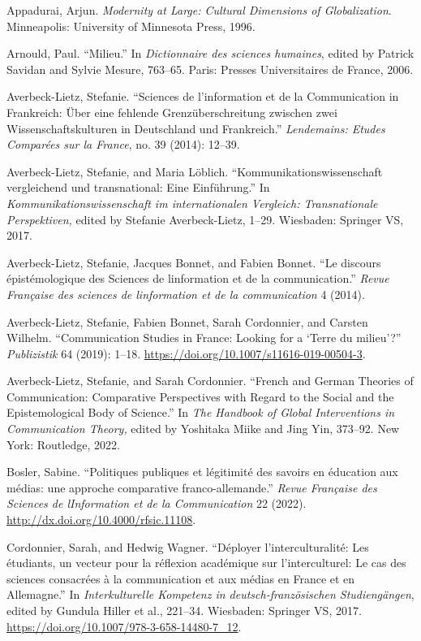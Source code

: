 \documentclass{tufte-handout}
\begin{document}
\begin{hangparas}{.25in}{1} 

\enlargethispage{\baselineskip}

Appadurai, Arjun. \emph{Modernity at Large: Cultural Dimensions of
Globalization}. Minneapolis: University of Minnesota Press, 1996.

Arnould, Paul. ``Milieu.'' In \emph{Dictionnaire des sciences humaines},
edited by Patrick Savidan and Sylvie Mesure, 763--65. Paris: Presses
Universitaires de France, 2006.

Averbeck-Lietz, Stefanie. ``Sciences de l'information et de la
Communication in Frankreich: Über eine fehlende Grenzüberschreitung
zwischen zwei Wissenschaftskulturen in Deutschland und Frankreich.''
\emph{Lendemains: Etudes Comparées sur la France}, no. 39 (2014):
12--39.

Averbeck-Lietz, Stefanie, and Maria Löblich.
``Kommunikationswissenschaft vergleichend und transnational: Eine
Einführung.'' In \emph{Kommunikationswissenschaft im internationalen
Vergleich: Transnationale Perspektiven,} edited by Stefanie
Averbeck-Lietz, 1--29. Wiesbaden: Springer VS, 2017.

Averbeck-Lietz, Stefanie, Jacques Bonnet, and Fabien Bonnet. ``Le
discours épistémologique des Sciences de l\textquotesingle information
et de la communication.'' \emph{Revue Française des sciences de
l\textquotesingle information et de la communication} 4 (2014).

Averbeck-Lietz, Stefanie, Fabien Bonnet, Sarah Cordonnier, and Carsten
Wilhelm. ``Communication Studies in France: Looking for a `Terre du
milieu'?'' \emph{Publizistik} 64 (2019): 1--18.
\url{https://doi.org/10.1007/s11616-019-00504-3}.

Averbeck-Lietz, Stefanie, and Sarah Cordonnier. ``French and German
Theories of Communication: Comparative Perspectives with Regard to the
Social and the Epistemological Body of Science.'' In \emph{The Handbook
of Global Interventions in Communication Theory,} edited by Yoshitaka
Miike and Jing Yin, 373--92. New York: Routledge, 2022.

Bosler, Sabine. ``Politiques publiques et légitimité des savoirs en
éducation aux médias: une approche comparative franco-allemande.''
\emph{Revue Française des Sciences de l\textquotesingle Information et
de la Communication} 22 (2022).
\url{http://dx.doi.org/10.4000/rfsic.11108}.

Cordonnier, Sarah, and Hedwig Wagner. ``Déployer l'interculturalité: Les
étudiants, un vecteur pour la réflexion académique sur l'interculturel:
Le cas des sciences consacrées à la communication et aux médias en
France et en Allemagne.'' In \emph{Interkulturelle Kompetenz in
deutsch-französischen Studiengängen}, edited by Gundula Hiller et al.,
221--34. Wiesbaden: Springer VS, 2017.
\url{https://doi.org/10.1007/978-3-658-14480-7_12}.


\end{hangparas}
\end{document}
